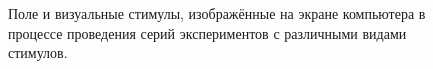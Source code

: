 \documentclass[12pt,fleqn]{article}
\begin{document}
\begin{figure}[h!]
\begin{minipage}[h!]{0.49\linewidth}
\end{minipage}
\hfill
\begin{minipage}[h!]{0.49\linewidth}
\end{minipage}
\caption{Поле и визуальные стимулы, изображённые на экране компьютера в процессе проведения серий экспериментов с различными видами стимулов.}
\label{field}
\end{figure}
\end{document}
